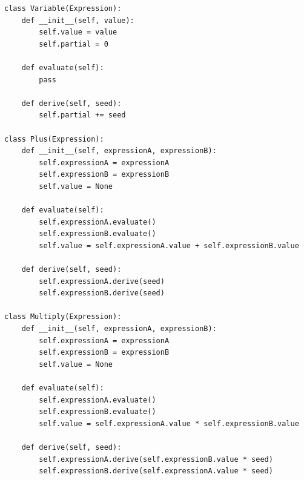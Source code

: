 \documentclass[zavrsnirad]{fer}
\begin{document}
\begin{lstlisting}[caption={Primjer implementacije unazadne metode u programskom jeziku \textit{Python} \cite{wiki:autodiff}}]
class Variable(Expression):
    def __init__(self, value):
        self.value = value
        self.partial = 0

    def evaluate(self):
        pass

    def derive(self, seed):
        self.partial += seed

class Plus(Expression):
    def __init__(self, expressionA, expressionB):
        self.expressionA = expressionA
        self.expressionB = expressionB
        self.value = None

    def evaluate(self):
        self.expressionA.evaluate()
        self.expressionB.evaluate()
        self.value = self.expressionA.value + self.expressionB.value

    def derive(self, seed):
        self.expressionA.derive(seed)
        self.expressionB.derive(seed)

class Multiply(Expression):
    def __init__(self, expressionA, expressionB):
        self.expressionA = expressionA
        self.expressionB = expressionB
        self.value = None

    def evaluate(self):
        self.expressionA.evaluate()
        self.expressionB.evaluate()
        self.value = self.expressionA.value * self.expressionB.value

    def derive(self, seed):
        self.expressionA.derive(self.expressionB.value * seed)
        self.expressionB.derive(self.expressionA.value * seed)
\end{lstlisting}
\end{document}
